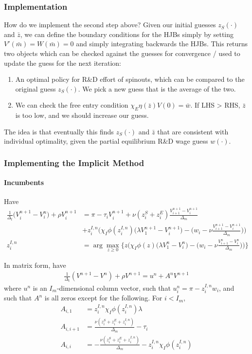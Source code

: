 \documentclass[12pt,english]{article}
\theoremstyle{remark}
\begin{document}
\subsubsection{Implementation}
How do we implement the second step above? Given our initial guesses $z_S(\cdot)$ and $\bar{z}$, we can define the boundary conditions for the HJBs simply by setting $V'(\bar{m}) = W(\bar{m}) = 0$ and simply integrating backwards the HJBs. This returns two objects which can be checked against the guesses for convergence / used to update the guess for the next iteration:
\begin{enumerate}
	\item An optimal policy for R\&D effort of spinouts, which can be compared to the original guess $z_S(\cdot)$. We pick a new guess that is the average of the two. 
	\item We can check the free entry condition $\chi_E \eta (\bar{z}) V(0) = \bar{w}$. If LHS > RHS, $\bar{z}$ is too low, and we should increase our guess. 
\end{enumerate}
The idea is that eventually this finds $z_S(\cdot)$ and $\bar{z}$ that are consistent with individual optimality, given the partial equilibrium R\&D wage guess $w(\cdot)$. 

\subsubsection{Implementing the Implicit Method}
\paragraph{Incumbents}
Have
\begin{align*}
	\frac{1}{\Delta_t} \Big(V_i^{n+1} - V_i^n \Big) + \rho V_i^{n+1} &= \pi -\tau_i V_i^{n+1} + \nu(z_i^S + z_i^E) \frac{V_{i+1}^{n+1} - V_i^{n+1}}{\Delta_m} \\
																	 &+ z_i^{I,n} \Big( \chi_I \phi (z_i^{I,n}) \big( \lambda V_1^{n+1} - V_i^{n+1} \big) - \Big( w_i - \nu \frac{V_{i+1}^{n+1} - V_i^{n+1}}{\Delta_m} \Big) \Big) \\
								z_i^{I,n} &= \arg \max_{z \ge 0} \Big\{  z \Big( \chi_I \phi (z) \big( \lambda V_1^{n} - V_i^{n} \big) - \Big( w_i - \nu \frac{V_{i+1}^{n} - V_i^{n}}{\Delta_m} \Big) \Big)    \Big\}
\end{align*} 

In matrix form, have
\begin{align*}
	\frac{1}{\Delta_t}(V^{n+1} - V^n) + \rho V^{n+1} = u^n + A^n V^{n+1}
\end{align*}
where $u^n$ is an $I_m$-dimensional column vector, such that $u^n_i = \pi - z_i^{I,n} w_i$, and such that $A^n$ is all zeros except for the following. For $i < I_m$,
\begin{align*}
	A_{i,1} &= z_i^{I,n} \chi_I \phi (z_i^{I,n}) \lambda \\
	A_{i,i+1} &= \frac{\nu(z_i^S + z_i^E + z_i^{I,n})}{\Delta_m} - \tau_i \\ 
	A_{i,i} &= -\frac{\nu(z_i^S + z_i^E + z_i^{I,n})}{\Delta_m} - z_i^{I,n} \chi_I \phi (z_i^{I,n})
\end{align*}
\end{document}
